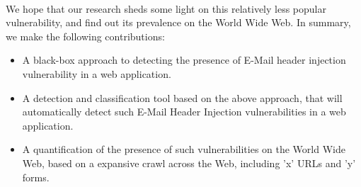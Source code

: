 \paragraph{} %
We hope that our research sheds some light on this relatively less popular vulnerability, and find out its prevalence on the World Wide Web. In summary, we make the following contributions:
\begin{itemize}
	
	\item{A black-box approach to detecting the presence of E-Mail header injection vulnerability in a web application.}
	
	\item{A detection and classification tool based on the above approach, that will automatically detect such E-Mail Header Injection vulnerabilities in a web application.}
	
	\item{A quantification of the presence of such vulnerabilities on the World Wide Web, based on a expansive crawl across the Web, including {'x'} URLs and {'y'} forms.}
	
\end{itemize}